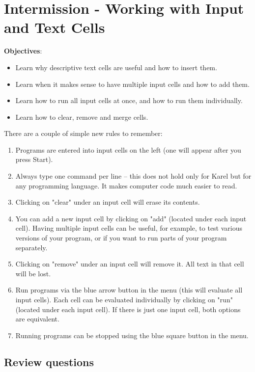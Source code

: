 \documentclass[article,A4,12pt]{llncs}
\begin{document}
\section{Intermission - Working with Input and Text Cells} \label{sec:editmenu}

\noindent
{\bf Objectives}: 
\begin{itemize}
\item Learn why descriptive text cells are useful and how to insert them.
\item Learn when it makes sense to have multiple input cells and how to add them.
\item Learn how to run all input cells at once, and how to run them individually.
\item Learn how to clear, remove and merge cells.
\end{itemize}
There are a couple of simple new rules to remember:
\begin{enumerate} 
\item Programs are entered into input cells on the left (one will appear after you press Start).
\item Always type one command per line -- this does not hold only for Karel but for any
      programming language. It makes computer code much easier to read.
\item Clicking on "clear" under an input cell will erase its contents.
\item You can add a new input cell by clicking on "add" (located under each input cell). 
      Having multiple input cells can be useful, for example, to test various versions 
      of your program, or if you want to run parts of your program separately. 
\item Clicking on "remove" under an input cell will remove it. All text in that cell will be lost.
\item Run programs via the blue arrow button in the menu (this will evaluate all input
      cells). Each cell can be evaluated individually by clicking on "run" (located under 
      each input cell). If there is just one input cell, both options are equivalent.
\item Running programs can be stopped using the blue square button in the menu.
\end{enumerate}

\subsection{Review questions}
\end{document}

